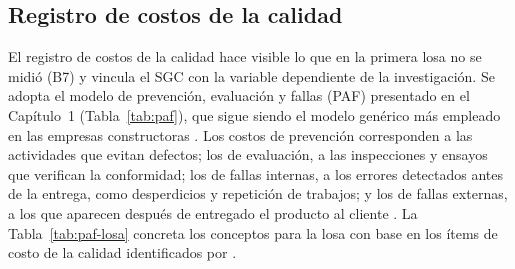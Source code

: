 \subsection{Registro de costos de la calidad}
\label{sec:sgc-costos}

El registro de costos de la calidad hace visible lo que en la primera losa no se midió (B7) y vincula el SGC con la variable dependiente de la investigación. Se adopta el modelo de prevención, evaluación y fallas (PAF) presentado en el Capítulo~1 (Tabla~\ref{tab:paf}), que sigue siendo el modelo genérico más empleado en las empresas constructoras \parencite[p.~43]{graciavillar2007}. Los costos de prevención corresponden a las actividades que evitan defectos; los de evaluación, a las inspecciones y ensayos que verifican la conformidad; los de fallas internas, a los errores detectados antes de la entrega, como desperdicios y repetición de trabajos; y los de fallas externas, a los que aparecen después de entregado el producto al cliente \parencite[pp.~48--49]{graciavillar2007}. La Tabla~\ref{tab:paf-losa} concreta los conceptos para la losa con base en los ítems de costo de la calidad identificados por \textcite[pp.~5409--5410]{khadim2023}.

